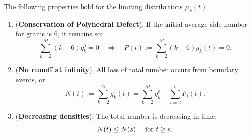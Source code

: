 \begin{theorem}  The following properties hold for the limiting distributions $\mu_k(t)$
\begin{enumerate}
\item (\textbf{Conservation of Polyhedral Defect}). If the initial average side number for grains is 6, it remains so:
\begin{equation}
\sum_{k = 2}^M(k-6)g_{k}^0= 0 \quad \Rightarrow \quad P(t):=\sum_{k = 2}^M(k-6)g_k(t)= 0.
\end{equation}
\item (\textbf{No runoff at infinity}).  All loss of total number occurs from boundary events, or
\begin{equation}
N(t) := \sum_{k =2}^M g_k(t) =  \sum_{k = 2}^M g_{k}^0-\sum_{i = 2}^5 F_i(t).
\end{equation}
\item (\textbf{Decreasing densities}).  The total number is decreasing in time:
\begin{equation}
N(t)\le N(s) \quad \hbox{ for } t\ge s.
\end{equation}
\end{enumerate}
\end{theorem}
